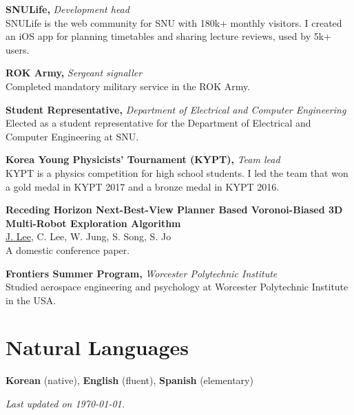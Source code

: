 \documentclass[a4paper,10pt,oneside]{memoir}
\begin{document}
\textbf{\textsf{SNULife,}} \textit{Development head}\\
SNULife is the web community for SNU with 180k+ monthly visitors. I created an iOS app for planning timetables and sharing lecture reviews, used by 5k+ users.
\vspace{0.5\onelineskip}

\textbf{\textsf{ROK Army,}} \textit{Sergeant signaller}\\
Completed mandatory military service in the ROK Army.
\vspace{0.5\onelineskip}

\textbf{\textsf{Student Representative,}} \textit{Department of Electrical and Computer Engineering}\\
Elected as a student representative for the Department of Electrical and Computer Engineering at SNU.
\vspace{0.5\onelineskip}

\textbf{\textsf{Korea Young Physicists' Tournament (KYPT),}} \textit{Team lead}\\
KYPT is a physics competition for high school students. I led the team that won a gold medal in KYPT 2017 and a bronze medal in KYPT 2016.
\vspace{0.5\onelineskip}

\textbf{\textsf{Receding Horizon Next-Best-View Planner Based Voronoi-Biased 3D Multi-Robot Exploration Algorithm}}\\
\ul{J. Lee}, C. Lee, W. Jung, S. Song, S. Jo\\
A domestic conference paper.
\vspace{0.5\onelineskip}

\textbf{\textsf{Frontiers Summer Program,}} \textit{Worcester Polytechnic Institute}\\
Studied aerospace engineering and psychology at Worcester Polytechnic Institute in the USA.

\section{Natural Languages}
\textbf{Korean} (native), \textbf{English} (fluent), \textbf{Spanish} (elementary)

\vfill\hfill \textit{Last updated on \today.}
\end{document}
